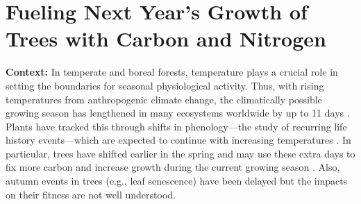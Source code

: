 \documentclass{article}
\begin{document}
\section*{Fueling Next Year's Growth of Trees with Carbon and Nitrogen}
\textbf {Context:}
In temperate and boreal forests, temperature plays a crucial role in setting the boundaries for seasonal physiological activity. Thus, with rising temperatures from anthropogenic climate change, the climatically possible growing season has lengthened in many ecosystems worldwide by up to 11 days \citep{korner_phenology_2010, menzel_growing_1999}. Plants have tracked this through shifts in phenology—the study of recurring life history events—which are expected to continue with increasing temperatures \citep{wolkovich_warming_2012}. In particular, trees have shifted earlier in the spring and may use these extra days to fix more carbon and increase growth during the current growing season \citep{keenan_net_2014, wang_interactive_2020}. Also, autumn events in trees (e.g., leaf senescence) have been delayed but the impacts on their fitness are not well understood.\\
\end{document}
